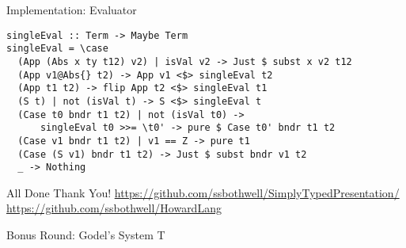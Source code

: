 \documentclass[presentation]{beamer}
\begin{document}
\begin{frame}[label={sec:org44ec3e8},fragile]{Implementation: Evaluator}
 \begin{verbatim}
singleEval :: Term -> Maybe Term
singleEval = \case
  (App (Abs x ty t12) v2) | isVal v2 -> Just $ subst x v2 t12
  (App v1@Abs{} t2) -> App v1 <$> singleEval t2
  (App t1 t2) -> flip App t2 <$> singleEval t1
  (S t) | not (isVal t) -> S <$> singleEval t
  (Case t0 bndr t1 t2) | not (isVal t0) -> 
      singleEval t0 >>= \t0' -> pure $ Case t0' bndr t1 t2
  (Case v1 bndr t1 t2) | v1 == Z -> pure t1
  (Case (S v1) bndr t1 t2) -> Just $ subst bndr v1 t2
  _ -> Nothing
\end{verbatim}
\end{frame}
\begin{frame}[label={sec:org7137535}]{All Done}
\center
Thank You!
\url{https://github.com/ssbothwell/SimplyTypedPresentation/}
\url{https://github.com/ssbothwell/HowardLang}
\end{frame}
\begin{frame}[label={sec:org6293cd9}]{Bonus Round: Godel's System T}
\end{frame}
\end{document}
